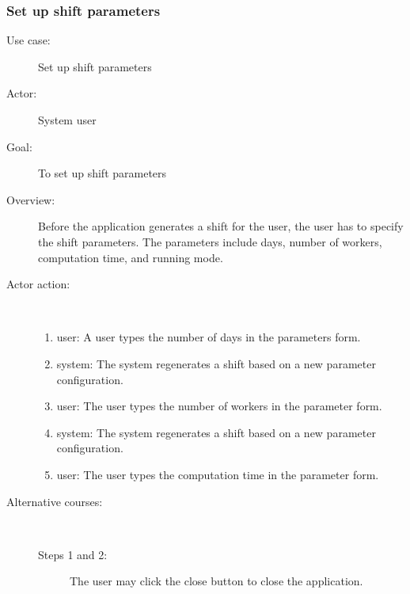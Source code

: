 \documentclass[11pt, oneside]{article}   	%
\begin{document}
\subsubsection{Set up shift parameters}
\begin{description}
\item[Use case:] Set up shift parameters
\item[Actor:] System user
\item[Goal:] To set up shift parameters
\item[Overview:] Before the application generates a shift for the user, the user has to specify the shift parameters.
The parameters include days, number of workers, computation time, and running mode.
\item[Actor action:]
\
\begin{enumerate}
\item user: A user types the number of days in the parameters form.
\item system: The system regenerates a shift based on a new parameter configuration.
\item user: The user types the number of workers in the parameter form.
\item system: The system regenerates a shift based on a new parameter configuration.
\item user: The user types the computation time in the parameter form.
\end{enumerate}

\item[Alternative courses:]
\
\begin{description}
\item[Steps 1 and 2:] The user may click the close button to close the application.
\end{description}

\end{description}
\end{document}

